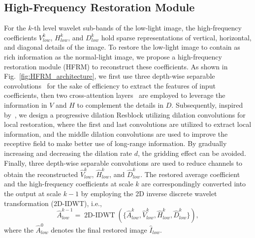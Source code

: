 \subsection{High-Frequency Restoration Module}\label{subsec:High-Frequency Restoration Module}
For the $k$-th level wavelet sub-bands of the low-light image, the high-frequency coefficients $V_{low}^{k}$, $H_{low}^{k}$, and $D_{low}^{k}$ hold sparse representations of vertical, horizontal, and diagonal details of the image. To restore the low-light image to contain as rich information as the normal-light image, we propose a high-frequency restoration module (HFRM) to reconstruct these coefficients. As shown in Fig.~\ref{fig:HFRM_architecture}, we first use three depth-wise separable convolutions~\cite{depth_conv} for the sake of efficiency to extract the features of input coefficients, then two cross-attention layers~\cite{cross_attention} are employed to leverage the information in $V$ and $H$ to complement the details in $D$. Subsequently, inspired by~\cite{SFDNet}, we design a progressive dilation Resblock utilizing dilation convolutions for local restoration, where the first and last convolutions are utilized to extract local information, and the middle dilation convolutions are used to improve the receptive field to make better use of long-range information. By gradually increasing and decreasing the dilation rate $d$, the gridding effect can be avoided. Finally, three depth-wise separable convolutions are used to reduce channels to obtain the reconstructed $\hat{V}_{low}^{k}$, $\hat{H}_{low}^{k}$, and $\hat{D}_{low}^{k}$. The restored average coefficient and the high-frequency coefficients at scale $k$ are correspondingly converted into the output at scale $k-1$ by employing the 2D inverse discrete wavelet transformation (2D-IDWT), i.e.,
\begin{equation}\label{eq:10}
	\hat{A}_{low}^{k-1} = \operatorname{2D-IDWT}(\{\hat{A}_{low}^{k}, \hat{V}_{low}^{k}, \hat{H}_{low}^{k}, \hat{D}_{low}^{k}\}),
\end{equation}
where the $\hat{A}_{low}^{0}$ denotes the final restored image $\hat{I}_{low}$.
